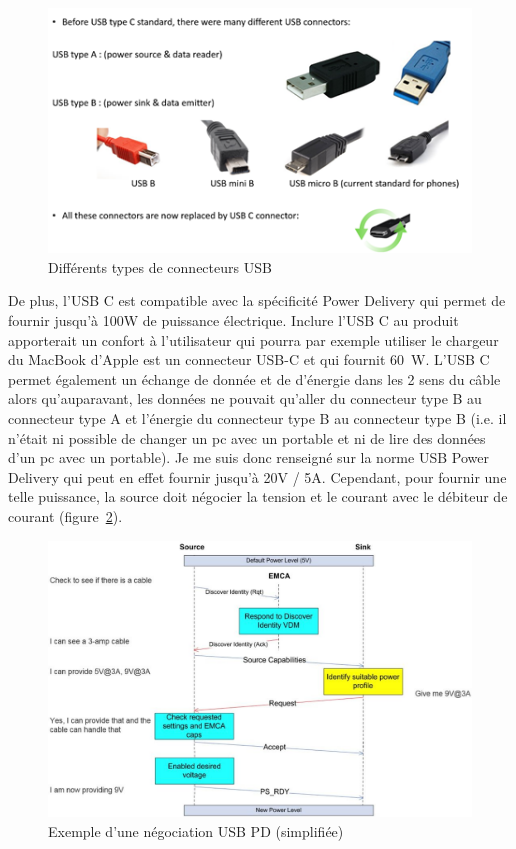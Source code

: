 \documentclass[a4paper, 12pt, sffamily]{report}
\begin{document}
\begin{figure}[H]
\centering
\includegraphics[scale=0.75]{figures/screenshots/different_usb_types.png}
\caption{Différents types de connecteurs USB}
\label{fig:usb_type}
\end{figure}

De plus, l’USB C est compatible avec la spécificité Power Delivery qui permet de fournir jusqu’à 100W de puissance électrique. Inclure l’USB C au produit apporterait un confort à l’utilisateur qui pourra par exemple utiliser le chargeur du MacBook d’Apple est un connecteur USB-C et qui fournit \SI{60}{\watt}.
L'USB C permet également un échange de donnée et de d'énergie dans les 2 sens du câble alors qu'auparavant, les données ne pouvait qu'aller du connecteur type B au connecteur type A et l'énergie du connecteur type B au connecteur type B (i.e. il n'était ni possible de changer un pc avec un portable et ni de lire des données d'un pc avec un portable).
Je me suis donc renseigné sur la norme USB Power Delivery qui peut en effet fournir jusqu’à 20V / 5A. Cependant, pour fournir une telle puissance, la source doit négocier la tension et le courant avec le débiteur de courant (figure~\ref{fig:usb_pd_negociation}).

\begin{figure}[H]
\centering
\includegraphics[scale=0.35]{figures/screenshots/usb_pd_nego.png}
\caption{Exemple d’une négociation USB PD (simplifiée) \cite{usb_pd_nego}}
\label{fig:usb_pd_negociation}
\end{figure}
\end{document}
